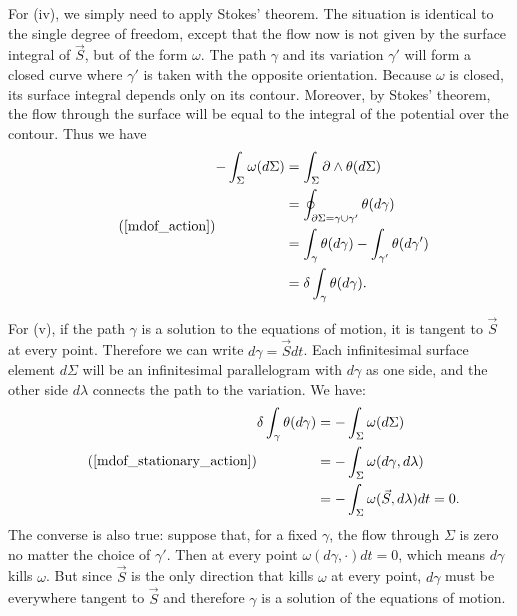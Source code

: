 \documentclass[fleqn,10pt]{wlscirep}
\begin{document}
For (iv), we simply need to apply Stokes' theorem. The situation is identical to the single degree of freedom, except that the flow now is not given by the surface integral of $\vec{S}$, but of the form $\omega$. The path $\gamma$ and its variation $\gamma'$ will form a closed curve where $\gamma'$ is taken with the opposite orientation. Because $\omega$ is closed, its surface integral depends only on its contour. Moreover, by Stokes' theorem, the flow through the surface will be equal to the integral of the potential over the contour. Thus we have
\begin{equation}
\tag*{(\ref{mdof_action})}
\begin{aligned}
	- \int_{\Sigma} \omega(d\Sigma) &=
	\int_{\Sigma} \partial \wedge \theta (d\Sigma) \\
	&= \oint_{\partial \Sigma = \gamma \cup \gamma'} \theta(d\gamma) \\
	&= \int_{\gamma} \theta(d\gamma) - \int_{\gamma'} \theta (d\gamma') \\
	&= \delta \int_{\gamma} \theta (d\gamma).
\end{aligned}
\end{equation}

For (v), if the path $\gamma$ is a solution to the equations of motion, it is tangent to $\vec{S}$ at every point. Therefore we can write $d\gamma= \vec{S} dt$. Each infinitesimal surface element $d\Sigma$ will be an infinitesimal parallelogram with $d\gamma$ as one side, and the other side $d\lambda$ connects the path to the variation. We have:
\begin{equation}
\tag*{(\ref{mdof_stationary_action})}
\begin{aligned}
	\delta \int_{\gamma} \theta (d\gamma) &= -\int_\Sigma \omega(d\Sigma) \\
	&= -\int_\Sigma \omega(d\gamma, d\lambda) \\
	&= -\int_\Sigma \omega(\vec{S}, d\lambda) dt = 0.
\end{aligned}
\end{equation}
The converse is also true: suppose that, for a fixed $\gamma$, the flow through $\Sigma$ is zero no matter the choice of $\gamma'$. Then at every point $\omega(d\gamma, \cdot) dt = 0$, which means $d\gamma$ kills $\omega$. But since $\vec{S}$ is the only direction that kills $\omega$ at every point, $d\gamma$ must be everywhere tangent to $\vec{S}$ and therefore $\gamma$ is a solution of the equations of motion.
\end{document}
